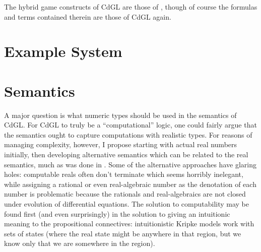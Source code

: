\documentclass[12pt]{cmuthesis}
\theoremstyle{definition}
\theoremstyle{remark}
\newcommand{\CdGL}{\textsf{CdGL}\xspace}
\begin{document}
The hybrid game constructs of \CdGL are those of \dGL, though of course the formulas and terms contained therein are those of \CdGL again.

\section{Example System}

\section{Semantics}
A major question is what numeric types should be used in the semantics of \CdGL.
For \CdGL to truly be a ``computational'' logic, one could fairly argue that the semantics ought to capture computations with realistic types.
For reasons of managing complexity, however, I propose starting with actual real numbers initially, then developing alternative semantics which can be related to the real semantics, much as was done in \cite{DBLP:conf/pldi/BohrerTMMP18}.
Some of the alternative approaches have glaring holes: computable reals often don't terminate which seems horribly inelegant, while assigning a rational or even real-algebraic number as the denotation of each number is problematic because the rationals and real-algebraics are not closed under evolution of differential equations.
The solution to computability may be found first (and even surprisingly) in the solution to giving an intuitionic meaning to the propositional connectives: intuitionistic Kripke models work with sets of states (where the real state might be anywhere in that region, but we know only that we are somewhere in the region).
\end{document}
